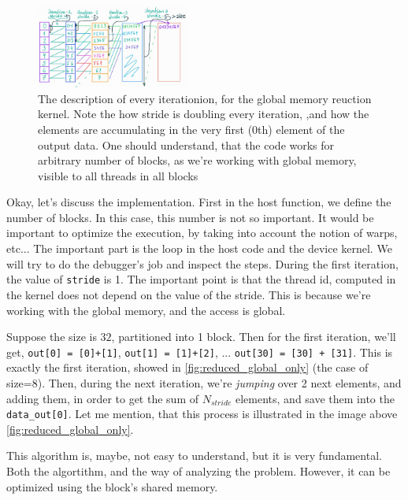 \documentclass[12pt]{article}
\begin{document}
\begin{figure}
   \vspace{-0.9cm}
   \begin{center}
   \includegraphics[width=0.45\textwidth]{pngs/reduce_only_global.jpg}
   \end{center}
   \vspace{-0.5cm}
   \captionsetup{justification=raggedleft}
   \caption{The description of every iterationion, for the global memory 
   reuction kernel. Note the how stride is doubling every iteration, 
   ,and how the elements are accumulating in the very first (0th) element of the output data. 
   One should understand, that the code works for arbitrary number of blocks, as we're working with global 
   memory, visible to all threads in all blocks}
   \label{fig:reduced_global_only}
\end{figure}
Okay, let's discuss the implementation. First in the host function, we define the number of blocks. 
In this case, this number is not so important. It would be important to optimize the execution, 
by taking into account the notion of warps, etc... The important part is the loop in the host code and 
the device kernel. We will try to do the debugger's job and inspect the steps. 
During the first iteration, the value of \verb|stride| is 1. The important point is that the thread id, 
computed in the kernel does not depend on the value of the stride. This is because we're working with the global 
memory, and the access is global.

Suppose the size is $32$, partitioned into 1 block. Then for the first iteration, we'll get, 
\verb|out[0] = [0]+[1]|, \verb|out[1] = [1]+[2]|, ... \verb|out[30] = [30] + [31]|. This is exactly the first iteration, 
showed in \autoref{fig:reduced_global_only} (the case of size=8). Then, during the next iteration, we're 
\textit{jumping} over 2 next elements, and adding them, in order to get the sum of $N_{stride}$ elements, and save them 
into the \verb|data_out[0]|. Let me mention, that this process is illustrated in the image above \autoref{fig:reduced_global_only}.

This algorithm is, maybe, not easy to understand, but it is very fundamental. Both the algortithm, and the 
way of analyzing the problem. However, it can be optimized using the block's shared memory.
\end{document}
